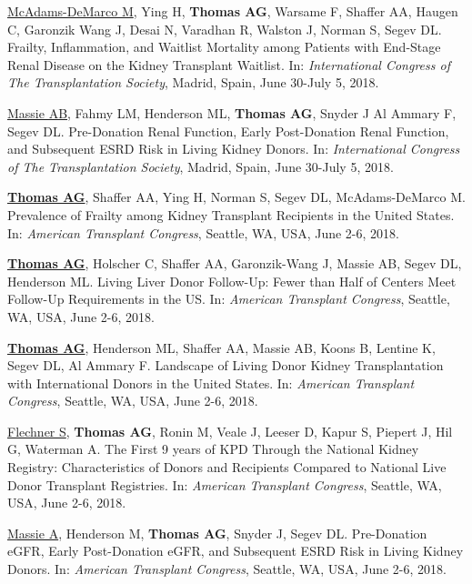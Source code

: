 \documentclass[10pt]{article}
\makeatletter
\newlength{\bibhang}
\newlength{\bibsep}
 {\@listi \global\bibsep\itemsep \global\advance\bibsep by\parsep}
\newenvironment{bibenum*}
  {\renewcommand\labelenumi{[\theenumi]}%
   \etaremune[
     topsep=0pt,
     itemsep=\bibsep,
     parsep=0pt,partopsep=0pt,
     itemindent=-\bibhang,
     leftmargin={\bibhang+\widthof{[999]}}]}
  {\endetaremune}
\makeatother
\begin{document}
\begin{bibenum*}
\item \underline{McAdams-DeMarco M}, Ying H, \textbf{Thomas AG},
  Warsame F, Shaffer AA, Haugen C, Garonzik Wang J, Desai N, Varadhan R,
  Walston J, Norman S, Segev DL.
  Frailty, Inflammation, and Waitlist Mortality among Patients with
  End-Stage Renal Disease on the Kidney Transplant Waitlist.
  In: \emph{International Congress of The Transplantation Society},
  Madrid, Spain, June 30-July 5, 2018.

\item \underline{Massie AB}, Fahmy LM, Henderson ML, \textbf{Thomas AG},
  Snyder J Al Ammary F, Segev DL.
  Pre-Donation Renal Function, Early Post-Donation Renal Function, and
  Subsequent ESRD Risk in Living Kidney Donors.
  In: \emph{International Congress of The Transplantation Society},
  Madrid, Spain, June 30-July 5, 2018.

\item \underline{\textbf{Thomas AG}}, Shaffer AA, Ying H, Norman S,
  Segev DL, McAdams-DeMarco M.
  Prevalence of Frailty among Kidney Transplant Recipients in the United States.
  In: \emph{American Transplant Congress},
  Seattle, WA, USA, June 2-6, 2018.

\item \underline{\textbf{Thomas AG}}, Holscher C, Shaffer AA,
  Garonzik-Wang J, Massie AB, Segev DL, Henderson ML.
  Living Liver Donor Follow-Up: Fewer than Half of
  Centers Meet Follow-Up Requirements in the US.
  In: \emph{American Transplant Congress},
  Seattle, WA, USA, June 2-6, 2018.

\item \underline{\textbf{Thomas AG}}, Henderson ML, Shaffer AA,
  Massie AB, Koons B, Lentine K, Segev DL, Al Ammary F.
  Landscape of Living Donor Kidney Transplantation with
  International Donors in the United States.
  In: \emph{American Transplant Congress},
  Seattle, WA, USA, June 2-6, 2018.

\item \underline{Flechner S}, \textbf{Thomas AG}, Ronin M,
  Veale J, Leeser D, Kapur S, Piepert J, Hil G, Waterman A.
  The First 9 years of KPD Through the National Kidney Registry:
  Characteristics of Donors and Recipients Compared to
  National Live Donor Transplant Registries.
  In: \emph{American Transplant Congress},
  Seattle, WA, USA, June 2-6, 2018.

\item \underline{Massie A}, Henderson M, \textbf{Thomas AG},
  Snyder J, Segev DL. Pre-Donation eGFR, Early Post-Donation eGFR,
  and Subsequent ESRD Risk in Living Kidney Donors.
  In: \emph{American Transplant Congress},
  Seattle, WA, USA, June 2-6, 2018.


\end{bibenum*}
\end{document}
